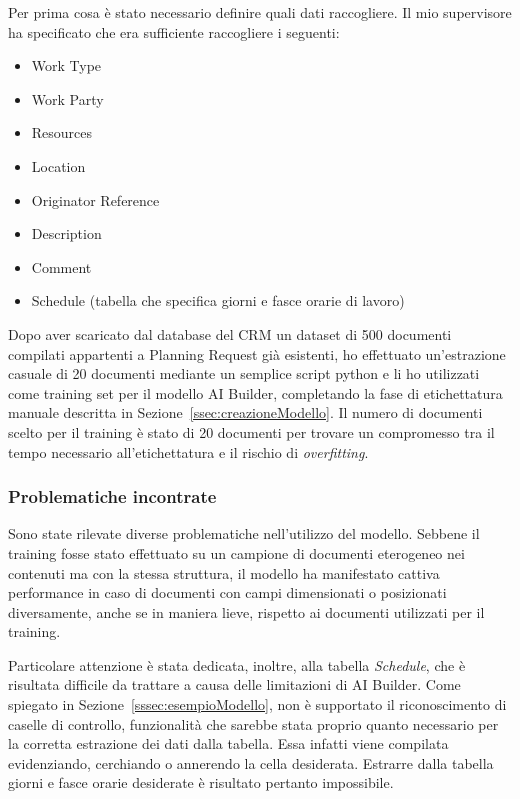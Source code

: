 Per prima cosa è stato necessario definire quali dati raccogliere. Il mio supervisore ha specificato che era sufficiente raccogliere i seguenti:
\begin{itemize}
  \item Work Type
  \item Work Party
  \item Resources
  \item Location
  \item Originator Reference
  \item Description
  \item Comment
  \item Schedule (tabella che specifica giorni e fasce orarie di lavoro)
\end{itemize}
Dopo aver scaricato dal database del CRM un dataset di \num{500} documenti compilati appartenti a Planning Request già esistenti, ho effettuato un'estrazione casuale di \num{20} documenti mediante un semplice script python e li ho utilizzati come training set per il modello AI Builder, completando la fase di etichettatura manuale descritta in Sezione~\ref{ssec:creazioneModello}. Il numero di documenti scelto per il training è stato di \num{20} documenti per trovare un compromesso tra il tempo necessario all'etichettatura e il rischio di \textit{overfitting}. 

\subsubsection{Problematiche incontrate}
Sono state rilevate diverse problematiche nell'utilizzo del modello.
Sebbene il training fosse stato effettuato su un campione di documenti eterogeneo nei contenuti ma con la stessa struttura, il modello ha manifestato cattiva performance in caso di documenti con campi dimensionati o posizionati diversamente, anche se in maniera lieve, rispetto ai documenti utilizzati per il training.

Particolare attenzione è stata dedicata, inoltre, alla tabella \textit{Schedule}, che è risultata difficile da trattare a causa delle limitazioni di AI Builder. Come spiegato in Sezione~\ref{sssec:esempioModello}, non è supportato il riconoscimento di caselle di controllo, funzionalità che sarebbe stata proprio quanto necessario per la corretta estrazione dei dati dalla tabella. Essa infatti viene compilata evidenziando, cerchiando o annerendo la cella desiderata. Estrarre dalla tabella giorni e fasce orarie desiderate è risultato pertanto impossibile.

